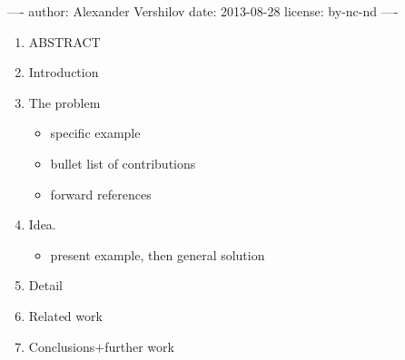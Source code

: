 ----
author:  Alexander Vershilov
date:    2013-08-28
license: by-nc-nd
----

\begin{enumerate}
  \item ABSTRACT

  \item Introduction

  \item The problem
  \begin{itemize}
    \item specific example
    \item bullet list of contributions
    \item forward references
  \end{itemize}

  \item Idea. 
  \begin{itemize}
    \item present example, then general solution
  \end{itemize}

  \item Detail

  \item Related work

  \item Conclusions+further work
\end{enumerate}


